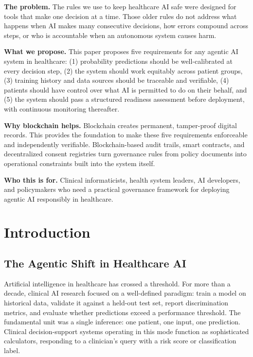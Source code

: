 \textbf{The problem.} The rules we use to keep healthcare AI safe were
designed for tools that make one decision at a time. Those older rules
do not address what happens when AI makes many consecutive decisions,
how errors compound across steps, or who is accountable when an
autonomous system causes harm.

\textbf{What we propose.} This paper proposes five requirements for any
agentic AI system in healthcare: (1) probability predictions should be
well-calibrated at every decision step, (2) the system should work
equitably across patient groups, (3) training history and data sources
should be traceable and verifiable, (4) patients should have control
over what AI is permitted to do on their behalf, and (5) the system
should pass a structured readiness assessment before deployment, with
continuous monitoring thereafter.

\textbf{Why blockchain helps.} Blockchain creates permanent,
tamper-proof digital records. This provides the foundation to make these
five requirements enforceable and independently verifiable.
Blockchain-based audit trails, smart contracts, and decentralized
consent registries turn governance rules from policy documents into
operational constraints built into the system itself.

\textbf{Who this is for.} Clinical informaticists, health system
leaders, AI developers, and policymakers who need a practical governance
framework for deploying agentic AI responsibly in healthcare.


\section{Introduction}\label{introduction}

\subsection{The Agentic Shift in Healthcare
AI}\label{the-agentic-shift-in-healthcare-ai}

Artificial intelligence in healthcare has crossed a threshold. For more
than a decade, clinical AI research focused on a well-defined paradigm:
train a model on historical data, validate it against a held-out test
set, report discrimination metrics, and evaluate whether predictions
exceed a performance threshold. The fundamental unit was a single
inference: one patient, one input, one prediction. Clinical
decision-support systems operating in this mode function as
sophisticated calculators, responding to a clinician's query with a risk
score or classification label.

